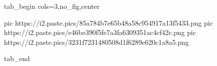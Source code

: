  
 
 
 
 


\ifcmt
  tab_begin cols=3,no_fig,center

     pic https://i2.paste.pics/85a784b7e65b48a58c954917a13f5433.png
		 pic https://i2.paste.pics/e46be390f5fe7a3fa6309351ac4cf42c.png
		 pic https://i2.paste.pics/3231f7231480508d1f6289e620c1a8a5.png

  tab_end
\fi
